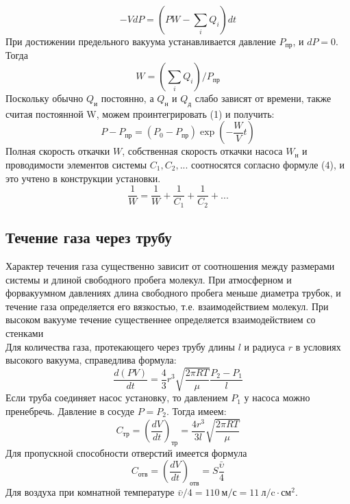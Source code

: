 \documentclass[a4paper, 12pt]{article}
\begin{document}
 \begin{equation}
   -VdP = (PW - \sum_i Q_i)dt
 \end{equation}
 При достижении предельного вакуума устанавливается давление $P_{\text{пр}}$, и $dP = 0$. Тогда
 \begin{equation}
    W = ( \sum_i Q_i )/P_{\text{пр}}
 \end{equation}
 Поскольку обычно $Q_\text{и}$ постоянно, а $Q_\text{н}$ и $Q_\text{д}$ слабо зависят от времени, также считая постоянной W, можем проинтегрировать (1) и получить:
 \begin{equation}
   P - P_{\text{пр}} = (P_0 - P_{\text{пр}})\exp(-\frac{W}{V}t)
 \end{equation}
Полная скорость откачки $W$, собственная скорость откачки насоса $W_{\text{н}}$ и проводимости элементов системы $C_1, C_2,...$ соотносятся согласно формуле (4), и это учтено в конструкции установки.
 \begin{equation}
 \frac{1}{W} = \frac{1}{W} + \frac{1}{C_1} + \frac{1}{C_2} + ...
\end{equation}

\subsection{Течение газа через трубу}
Характер течения газа существенно зависит от соотношения между размерами системы и длиной свободного пробега молекул. При атмосферном и форвакуумном давлениях  длина свободного пробега меньше диаметра трубок, и течение газа определяется его вязкостью, т.е. взаимодействием молекул. При высоком вакууме течение существеннее определяется взаимодействием со стенками \\
Для количества газа, протекающего через трубу длины $l$ и радиуса $r$ в условиях высокого вакуума, справедлива формула:
\begin{equation}
  \frac{d(PV)}{dt} = \frac{4}{3}r^3\sqrt{\frac{2\pi RT}{\mu}}\frac{P_2 - P_1}{l}
\end{equation}
Если труба соединяет насос установку, то давлением $P_1$ у насоса можно пренебречь. Давление в сосуде $P = P_2$. Тогда имеем:
\begin{equation}
C_\text{тр} = \left(\frac{dV}{dt}\right)_\text{тр} = \frac{4r^3}{3l}\sqrt{\frac{2\pi RT}{\mu}}
\end{equation}
Для пропускной способности отверстий имеется формула
\begin{equation}
C_\text{отв} = \left(\frac{dV}{dt}\right)_\text{отв} = S\frac{\bar{\upsilon}}{4}
\end{equation}
Для воздуха при комнатной температуре $\bar{\upsilon}/4 = 110~\text{м/с} = 11~\text{л/c}\cdot\text{см}^2$.
\end{document}
